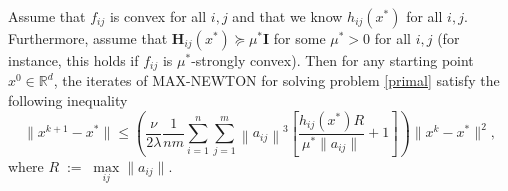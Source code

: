 \documentclass[12pt]{article}
\newcommand{\eqdef}{\; { := }\;}
\newcommand{\R}{\mathbb{R}}
\newcommand{\newalpha}{h}
\newcommand{\mH}{\mathbf{H}}
\newcommand{\mI}{\mathbf{I}}
\begin{document}
\begin{theorem}\label{th:maxnewton}
	Assume that $f_{ij}$ is convex for all $i,j$ and that we know  $\newalpha_{ij}(x^*)$ for all $i,j$. Furthermore, assume that $\mH_{ij}(x^*) \succeq \mu^* \mI$ for some $\mu^*>0$ for all $i,j$ (for instance, this holds if $f_{ij}$ is $\mu^*$-strongly convex). Then for any starting point $x^0 \in \R^d$, the iterates of {\sf MAX-NEWTON} for solving problem \eqref{primal} satisfy the following inequality
	$$
	\|x^{k+1}-x^*\| \leq  \left(\frac{\nu}{2\lambda} \frac{1}{nm}\sum\limits_{i=1}^n\sum\limits_{j=1}^m\left\|a_{ij}\right\|^3\left[\frac{\newalpha_{ij}(x^*)R}{\mu^*\|a_{ij}\|}+ 1\right] \right) \|x^k-x^*\|^2,
	$$
	where $R\eqdef \max\limits_{ij}\|a_{ij}\|$.
\end{theorem}
\end{document}
